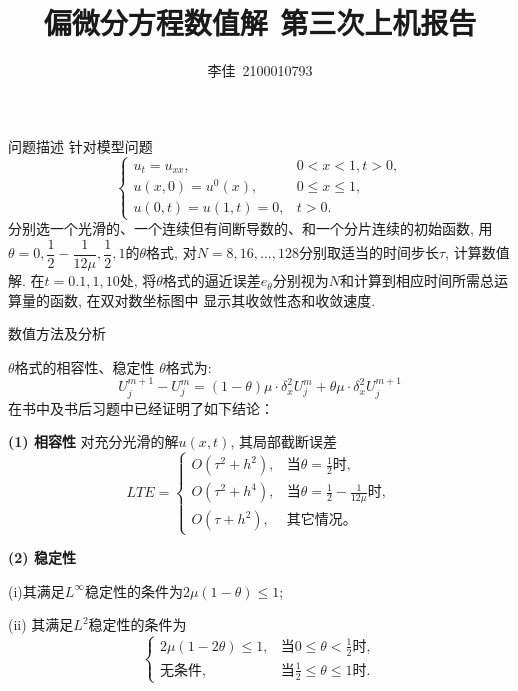 \documentclass{article}
\title{偏微分方程数值解$\ \ $第三次上机报告}
\author{李佳~2100010793}
\date{}
\begin{document}
\maketitle
\begin{section}{问题描述}
    针对模型问题$$\left\{\begin{array}{ll}
        u_t = u_{xx}, &0<x<1,t>0,\\
        u(x,0)=u^0(x), & 0\leq x \leq 1,\\
        u(0,t) = u(1,t) = 0, & t>0.
    \end{array}\right.$$
    分别选一个光滑的、一个连续但有间断导数的、和一个分片连续的初始函数, 
    用$\theta=0,\dfrac{1}{2}-\dfrac{1}{12\mu},\dfrac{1}{2},1$的$\theta$格式, 对$N=8,16,...,128$分别取适当的时间步长$\tau$, 
    计算数值解. 在$t=0.1,1,10$处, 将$\theta$格式的逼近误差$e_\theta$分别视为$N$和计算到相应时间所需总运算量的函数, 在双对数坐标图中
    显示其收敛性态和收敛速度.
\end{section}
\begin{section}{数值方法及分析}
    \begin{subsection}{$\theta$格式的相容性、稳定性}
        $\theta$格式为:
        \begin{equation}
            U_j^{m+1} - U_j^m = (1-\theta)\mu\cdot \delta_x^2 U_j^m + \theta\mu\cdot \delta_x^2 U_j^{m+1}
        \end{equation}
        在书中及书后习题中已经证明了如下结论：

        \noindent\textbf{(1) 相容性} 对充分光滑的解$u(x,t)$, 其局部截断误差
        $$LTE=\left\{\begin{array}{ll}
            O(\tau^2+h^2), &\text{当}\theta=\frac{1}{2}\text{时},\\
            O(\tau^2+h^4), &\text{当}\theta=\frac{1}{2}-\frac{1}{12\mu}\text{时},\\
            O(\tau+h^2),   &\text{其它情况}。
        \end{array}\right.$$

        \noindent\textbf{(2) 稳定性} 

        (i)其满足$L^\infty$稳定性的条件为$2\mu(1-\theta)\leq 1$;

        (ii) 其满足$L^2$稳定性的条件为
        $$\left\{\begin{array}{ll}
            2\mu(1-2\theta)\leq 1, &\text{当}0\leq\theta<\frac{1}{2}\text{时},\\
            \text{无条件}, &\text{当}\frac{1}{2}\leq\theta\leq 1\text{时}.
        \end{array}\right.$$
    \end{subsection}
\end{section}
\end{document}
